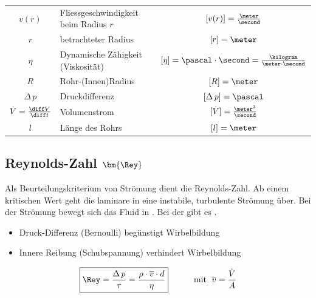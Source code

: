 \renewcommand{\arraystretch}{1.3}
\begin{tabular}{c l c}
    $v(r)$                              & Fliessgeschwindigkeit beim Radius $r$ & $[v(r)] = \frac{\meter}{\second}$         \\
    $r$                                 & betrachteter Radius                   & $[r] = \meter$                            \\
    $\eta$                              & Dynamische Zähigkeit (Viskosität)     & $[\eta] = \pascal \cdot \second = \frac{\kilogram}{\meter \cdot \second}$             \\
    $R$                                 & Rohr-(Innen)Radius                    & $[R] = \meter$                            \\
    $\Delta \, p$                       & Druckdifferenz                        & $[\Delta \, p] = \pascal$                 \\
    $\dot{V} = \frac{\diff V}{\diff t}$ &  Volumenstrom                         & $[\dot{V}] = \frac{\meter^3}{\second}$	\\
    $l$                                 & Länge des Rohrs                       & $[l] = \meter$
\end{tabular}
\renewcommand{\arraystretch}{1}

\subsection[Reynolds-Zahl]{Reynolds-Zahl $\bm{\Rey}$}
Als Beurteilungskriterium von Strömung dient die Reynolds-Zahl. Ab einem kritischen Wert geht die laminare in eine instabile, turbulente Strömung über. Bei der
 Strömung bewegt sich das Fluid in . Bei der
 gibt es .

\smallskip
\begin{itemize}
    \item Druck-Differenz (Bernoulli) begünstigt Wirbelbildung
    \item Innere Reibung (Schubspannung) verhindert Wirbelbildung 
\end{itemize}

\[\boxed{ \Rey = \frac{\Delta \, p}{\tau} = \frac{\rho \cdot \overline{v} \cdot d}{\eta}} \qquad \quad \text{mit } \; \overline{v} = \frac{\dot{V}}{A} \]


